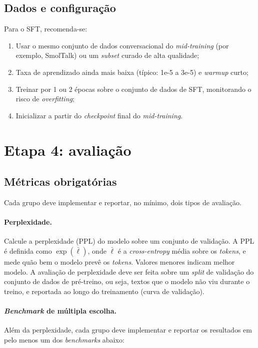 \documentclass{dlproblemset}
\begin{document}
\subsection*{Dados e configuração}

Para o SFT, recomenda-se:

\begin{enumerate}[1)]
    \item Usar o mesmo conjunto de dados conversacional do \textit{mid-training} (por exemplo, SmolTalk) ou um \textit{subset} curado de alta qualidade;
    \item Taxa de aprendizado ainda mais baixa (típico: 1e-5 a 3e-5) e \textit{warmup} curto;
    \item Treinar por 1 ou 2 épocas sobre o conjunto de dados de SFT, monitorando o risco de \textit{overfitting};
    \item Inicializar a partir do \textit{checkpoint} final do \textit{mid-training}.
\end{enumerate}

\section*{Etapa 4: avaliação}

\subsection*{Métricas obrigatórias}

Cada grupo deve implementar e reportar, no mínimo, dois tipos de avaliação.

\paragraph{Perplexidade.} Calcule a perplexidade (PPL) do modelo sobre um conjunto de validação. A PPL é definida como $\exp(\bar{\ell})$, onde $\bar{\ell}$ é a \textit{cross-entropy} média sobre os \textit{tokens}, e mede quão bem o modelo prevê os \textit{tokens}. Valores menores indicam melhor modelo. A avaliação de perplexidade deve ser feita sobre um \textit{split} de validação do conjunto de dados de pré-treino, ou seja, textos que o modelo não viu durante o treino, e reportada ao longo do treinamento (curva de validação).

\paragraph{\textit{Benchmark} de múltipla escolha.} Além da perplexidade, cada grupo deve implementar e reportar os resultados em pelo menos um dos \textit{benchmarks} abaixo:
\end{document}
